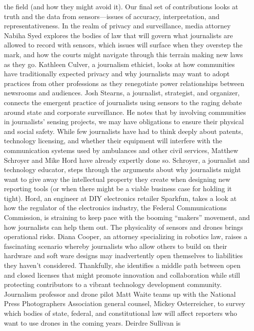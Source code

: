 the field (and how they might avoid it). Our final set of contributions looks
at truth and the data from sensors—issues of accuracy, interpretation, and
representativeness.
In the realm of privacy and surveillance, media attorney Nabiha Syed
explores the bodies of law that will govern what journalists are allowed to
record with sensors, which issues will surface when they overstep the mark,
and how the courts might navigate through this terrain making new laws as
they go. Kathleen Culver, a journalism ethicist, looks at how communities
have traditionally expected privacy and why journalists may want to adopt
practices from other professions as they renegotiate power relationships
between newsrooms and audiences. Josh Stearns, a journalist, strategist,
and organizer, connects the emergent practice of journalists using sensors
to the raging debate around state and corporate surveillance. He notes that
by involving communities in journalists' sensing projects, we may have obligations
to ensure their physical and social safety.
While few journalists have had to think deeply about patents, technology
licensing, and whether their equipment will interfere with the communication
systems used by ambulances and other civil services, Matthew Schroyer
and Mike Hord have already expertly done so. Schroyer, a journalist and
technology educator, steps through the arguments about why journalists
might want to give away the intellectual property they create when designing
new reporting tools (or when there might be a viable business case for
holding it tight). Hord, an engineer at DIY electronics retailer Sparkfun,
takes a look at how the regulator of the electronics industry, the Federal
Communications Commission, is straining to keep pace with the booming
``makers'' movement, and how journalists can help them out.
The physicality of sensors and drones brings operational risks. Diana Cooper,
an attorney specializing in robotics law, raises a fascinating scenario
whereby journalists who allow others to build on their hardware and soft
ware designs may inadvertently open themselves to liabilities they haven't
considered. Thankfully, she identifies a middle path between open and
closed licenses that might promote innovation and collaboration while still
protecting contributors to a vibrant technology development community.
Journalism professor and drone pilot Matt Waite teams up with the National
Press Photographers Association general counsel, Mickey Osterreicher, to
survey which bodies of state, federal, and constitutional law will affect
reporters who want to use drones in the coming years. Deirdre Sullivan is
